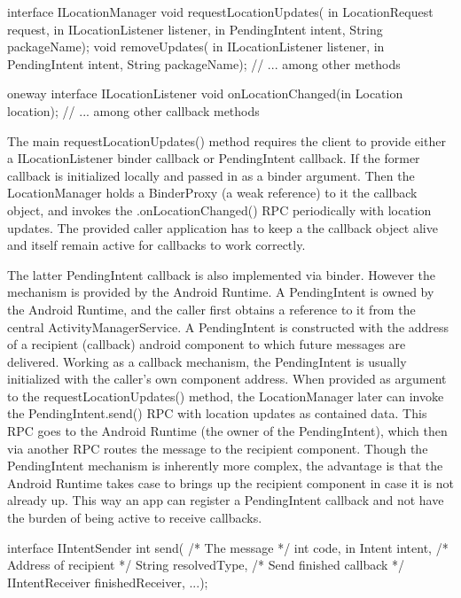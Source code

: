 \documentclass[prodmode]{acmlarge}
\begin{document}
\begin{snippet}
interface ILocationManager {
  void requestLocationUpdates(
      in LocationRequest request,
      in ILocationListener listener,
      in PendingIntent intent,
      String packageName);
  void removeUpdates(
      in ILocationListener listener,
      in PendingIntent intent,
      String packageName);
  // ... among other methods
}
\end{snippet}

\begin{snippet}
oneway interface ILocationListener {
    void onLocationChanged(in Location location);
    // ... among other callback methods
}
\end{snippet}

The main requestLocationUpdates() method requires the client to provide either a ILocationListener binder callback or PendingIntent callback. If the former callback is initialized locally and passed in as a binder argument. Then the LocationManager holds a BinderProxy (a weak reference) to it the callback object, and invokes the .onLocationChanged() RPC periodically with location updates. The provided caller application has to keep a the callback object alive and itself remain active for callbacks to work correctly.

The latter PendingIntent callback is also implemented via binder. However the mechanism is provided by the Android Runtime. A PendingIntent is owned by the Android Runtime, and the caller first obtains a reference to it from the central ActivityManagerService. A PendingIntent is constructed with the address of a recipient (callback) android component to which future messages are delivered. Working as a callback mechanism, the PendingIntent is usually initialized with the caller's own component address. When provided as argument to the requestLocationUpdates() method, the LocationManager later can invoke the PendingIntent.send() RPC with location updates as contained data. This RPC goes to the Android Runtime (the owner of the PendingIntent), which then via another RPC routes the message to the recipient component. Though the PendingIntent mechanism is inherently more complex, the advantage is that the Android Runtime takes case to brings up the recipient component in case it is not already up. This way an app can register a PendingIntent callback and not have the burden of being active to receive callbacks.

\begin{snippet}
interface IIntentSender {
  int send(
    /* The message */
    int code, in Intent intent,
    /* Address of recipient */
    String resolvedType,
    /* Send finished callback */
    IIntentReceiver finishedReceiver,
    ...);
}
\end{snippet}
\end{document}
